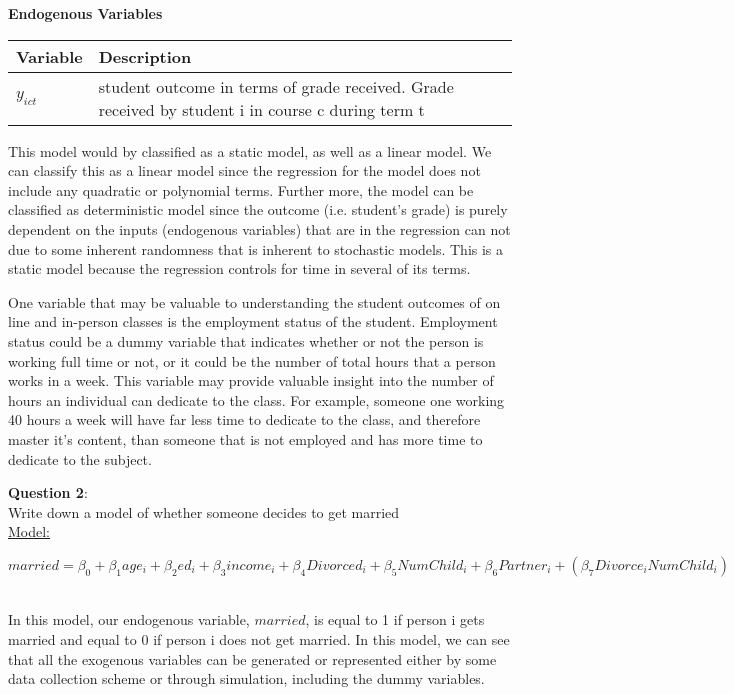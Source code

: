 \documentclass[11pt]{article}
\begin{document}
\begin{table}[htbp]
\centering
\textbf{Endogenous Variables}
\hline \hline
	\begin{tabular}{|p{4.15cm} |  p{14.0cm}|}
		Variable & Description \\ \hline
		$y_{ict}$ & student outcome in terms of grade received. Grade received by student i in course c during term t \\ \hline
	\end{tabular}
\end{table}

This model would by classified as a static model, as well as a linear model. We can classify this as a linear model since the regression for the model does not include any quadratic or polynomial terms. Further more, the model can be classified as deterministic model since the outcome (i.e. student's grade) is purely dependent on the inputs (endogenous variables) that are in the regression can not due to some inherent randomness that is inherent to stochastic models. This is a static model because the regression controls for time in several of its terms. 

One variable that may be valuable to understanding the student outcomes of on line and in-person classes is the employment status of the student. Employment status could be a dummy variable that indicates whether or not the person is working full time or not, or it could be the number of total hours that a person works in a week. This variable may provide valuable insight into the number of hours an individual can dedicate to the class. For example, someone one working 40 hours a week will have far less time to dedicate to the class, and therefore master it's content, than someone that is not employed and has more time to dedicate to the subject. 




\newpage

\noindent\textbf{Question 2}:\\

Write down a model of whether someone decides to get married\\

\underline{Model:}\\

{\centering $married = \beta_0 +  \beta_1age_i + \beta_2ed_i + \beta_3income_i + \beta_4Divorced_i + \beta_5NumChild_i + \beta _6Partner_i + (\beta_7Divorce_iNumChild_i)$\par}\\ 
\vspace{5mm}
In this model, our endogenous variable, $married$, is equal to 1 if person i gets married and equal to 0 if person i does not get married. In this model, we can see that all the exogenous variables can be generated or represented either by some data collection scheme or through simulation, including the dummy variables. \\
\end{document}
